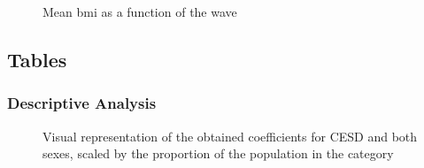 \begin{figure}[H]
\caption{Mean bmi as a function of the wave}
\label{fig:wavebmi}
\end{figure}


\subsection{Tables}

\subsubsection{Descriptive Analysis}

\begin{figure}[H]
\caption{Visual representation of the obtained coefficients for CESD and both sexes, scaled by the proportion of the population in the category }
\label{fig:results2}
\end{figure}



